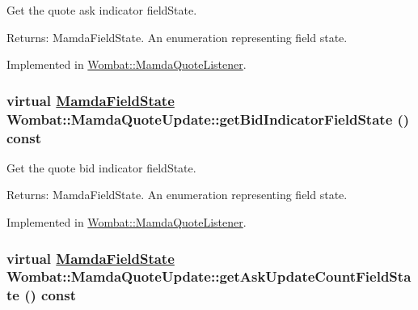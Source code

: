 Get the quote ask indicator field\-State. 

\begin{Desc}
\item[Returns:]Mamda\-Field\-State. An enumeration representing field state. \end{Desc}


Implemented in \hyperlink{classWombat_1_1MamdaQuoteListener_20c6b7c6cf1359fdd184a7d83bc93521}{Wombat::Mamda\-Quote\-Listener}.\hypertarget{classWombat_1_1MamdaQuoteUpdate_14c2e72cc5dff78c9e5d774d71f5d73b}{
\subsubsection[getBidIndicatorFieldState]{\setlength{\rightskip}{0pt plus 5cm}virtual \hyperlink{namespaceWombat_93aac974f2ab713554fd12a1fa3b7d2a}{Mamda\-Field\-State} Wombat::Mamda\-Quote\-Update::get\-Bid\-Indicator\-Field\-State () const}}
\label{classWombat_1_1MamdaQuoteUpdate_14c2e72cc5dff78c9e5d774d71f5d73b}


Get the quote bid indicator field\-State. 

\begin{Desc}
\item[Returns:]Mamda\-Field\-State. An enumeration representing field state. \end{Desc}


Implemented in \hyperlink{classWombat_1_1MamdaQuoteListener_276b02c48efaa043e0d394569fe68a02}{Wombat::Mamda\-Quote\-Listener}.\hypertarget{classWombat_1_1MamdaQuoteUpdate_a00f737c0e8b356fb5b9a56e4c02ae98}{
\subsubsection[getAskUpdateCountFieldState]{\setlength{\rightskip}{0pt plus 5cm}virtual \hyperlink{namespaceWombat_93aac974f2ab713554fd12a1fa3b7d2a}{Mamda\-Field\-State} Wombat::Mamda\-Quote\-Update::get\-Ask\-Update\-Count\-Field\-State () const}}
\label{classWombat_1_1MamdaQuoteUpdate_a00f737c0e8b356fb5b9a56e4c02ae98}


